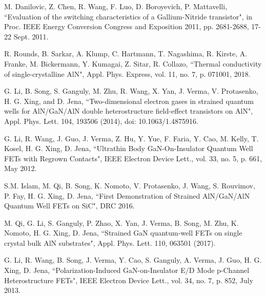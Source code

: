 \documentclass[journal]{IEEEtran}
\begin{document}
\vfill

{\color{white}
\pagebreak
}


%

\begin{thebibliography}{00}

 M. Danilovic, Z. Chen, R. Wang, F. Luo, D. Boroyevich, P. Mattavelli, ``Evaluation of the switching characteristics of a Gallium-Nitride transistor", in Proc. IEEE Energy Conversion Congress and Exposition 2011, pp. 2681-2688, 17-22 Sept. 2011.

\bibitem{} R. Rounds, B. Sarkar, A. Klump, C. Hartmann, T. Nagashima, R. Kirste, A. Franke, M. Bickermann, Y. Kumagai, Z. Sitar, R. Collazo, ``Thermal conductivity of single-crystalline AlN", Appl. Phys. Express, vol. 11, no. 7, p. 071001, 2018.

\bibitem{} G. Li, B. Song, S. Ganguly, M. Zhu, R. Wang, X. Yan, J. Verma, V. Protasenko, H. G. Xing, and D. Jena, ``Two-dimensional electron gases in strained quantum wells for AlN/GaN/AlN
double heterostructure field-effect transistors on AlN",  Appl. Phys. Lett. 104, 193506 (2014), doi: 10.1063/1.4875916.

 G. Li, R. Wang, J. Guo, J. Verma, Z. Hu, Y. Yue, F. Faria, Y. Cao, M. Kelly, T. Kosel, H. G. Xing, D. Jena, ``Ultrathin Body GaN-On-Insulator Quantum Well FETs with Regrown Contacts",  IEEE Electron Device Lett., vol. 33, no. 5, p. 661, May 2012.

 S.M. Islam, M. Qi, B. Song, K. Nomoto, V. Protasenko, J. Wang, S. Rouvimov, P. Fay, H. G. Xing, D. Jena, ``First Demonstration of Strained AlN/GaN/AlN Quantum Well FETs on SiC", DRC 2016.

 M. Qi, G. Li, S. Ganguly, P. Zhao, X. Yan, J. Verma, B. Song, M. Zhu, K. Nomoto, H. G. Xing, D. Jena, ``Strained GaN quantum-well FETs on single crystal bulk AlN substrates", Appl. Phys. Lett. 110, 063501 (2017).

 G. Li, R. Wang, B. Song, J. Verma, Y. Cao, S. Ganguly, A. Verma, J. Guo, H. G. Xing, D. Jena, ``Polarization-Induced GaN-on-Insulator E/D Mode p-Channel Heterostructure FETs", IEEE Electron Device Lett., vol. 34, no. 7, p. 852, July 2013.


\end{thebibliography}
\end{document}
